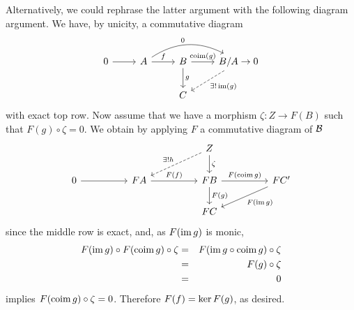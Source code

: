 \documentclass[reqno, 12pt]{amsart}
\begin{document}
\begin{remark}
  Alternatively, we could rephrase the latter argument with the following diagram argument.
  We have, by unicity, a commutative diagram
  $$\begin{tikzcd}
    0 \arrow{r} & A \arrow[bend left]{rr}{0}\arrow{r}{f} & B \arrow{r}{\op{coim}(g)}\arrow{d}{g} & B/A \arrow[dashed]{ld}{\exists !\op{im}(g)} \to 0\\
    & & C
  \end{tikzcd}$$
  with exact top row.
  Now assume that we have a morphism $\zeta \colon Z \to F(B)$ such that $F(g) \circ \zeta = 0$.
  We obtain by applying $F$ a commutative diagram of $\mathcal{B}$
  $$\begin{tikzcd}[column sep=huge]
    &&Z\arrow{d}{\zeta}\arrow[dashed,swap]{ld}{\exists !h}\\
    0 \arrow{r} & FA \arrow{r}{F(f)} & FB \arrow{d}{F(g)}\arrow{r}{F(\op{coim}g)} & FC^\prime \arrow{ld}{F(\op{im}g)}\\
    & & FC
  \end{tikzcd}$$
  since the middle row is exact, and, as $F(\operatorname{im}g)$ is monic,
  \begin{eqnarray*}
    F(\operatorname{im}g) \circ F(\operatorname{coim}g) \circ \zeta
    &=& F(\operatorname{im}g \circ \operatorname{coim}g) \circ \zeta\\
    &=& F(g) \circ \zeta\\
    &=& 0
  \end{eqnarray*}
  implies $F(\operatorname{coim}g) \circ \zeta = 0$.
  Therefore $F(f) = \operatorname{ker} F(g)$, as desired.
\end{remark}
\end{document}
